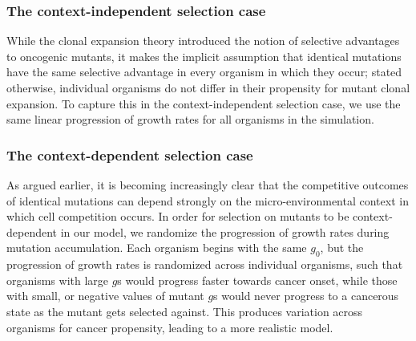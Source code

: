 \documentclass[9pt,twocolumn,twoside]{pnas-new}
\begin{document}
		\subsubsection*{The context-independent selection case}
		While the clonal expansion theory introduced the notion of selective advantages to oncogenic mutants, it makes the implicit assumption that identical mutations have the same selective advantage in every organism in which they occur; stated otherwise, individual organisms do not differ in their propensity for mutant clonal expansion. To capture this in the context-independent selection case, we use the same linear progression of growth rates for all organisms in the simulation.

		\subsubsection*{The context-dependent selection case}
		As argued earlier, it is becoming increasingly clear that the competitive outcomes of identical mutations can depend strongly on the micro-environmental context in which cell competition occurs. In order for selection on mutants to be context-dependent in our model, we randomize the progression of growth rates during mutation accumulation. Each organism begins with the same $g_{0}$, but the progression of growth rates is randomized across individual organisms, such that organisms with large $g$s would progress faster towards cancer onset, while those with small, or negative values of mutant $g$s would never progress to a cancerous state as the mutant gets selected against. This produces variation across organisms for cancer propensity, leading to a more realistic model.
\end{document}
